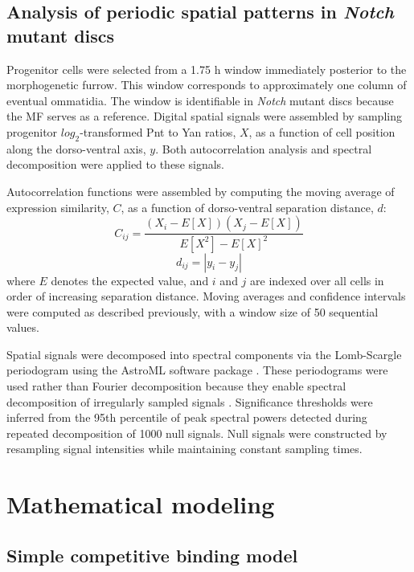 \subsection{Analysis of periodic spatial patterns in \textit{Notch} mutant discs}
\label{appendix:methods:ratio:autocorrelation}

Progenitor cells were selected from a 1.75 h window immediately posterior to the morphogenetic furrow. This window corresponds to approximately one column of eventual ommatidia. The window is identifiable in \textit{Notch} mutant discs because the MF serves as a reference. Digital spatial signals were assembled by sampling progenitor $log_2$-transformed Pnt to Yan ratios, $X$, as a function of cell position along the dorso-ventral axis, $y$. Both autocorrelation analysis and spectral decomposition were applied to these signals.

Autocorrelation functions were assembled by computing the moving average of expression similarity, $C$, as a function of dorso-ventral separation distance, $d$:
\begin{equation}
C_{ij} = \frac{ (X_i-E[X])(X_j-E[X]) }{ E[X^2] - E[X]^2 }
\end{equation}
\begin{equation}
d_{ij} = | y_i - y_j |
\end{equation}
where $E$ denotes the expected value, and $i$ and $j$ are indexed over all cells in order of increasing separation distance. Moving averages and confidence intervals were computed as described previously, with a window size of 50 sequential values.

Spatial signals were decomposed into spectral components via the Lomb-Scargle periodogram using the AstroML software package \cite{VanderPlas2012}. These periodograms were used rather than Fourier decomposition because they enable spectral decomposition of irregularly sampled signals \cite{VanderPlas2018}. Significance thresholds were inferred from the 95th percentile of peak spectral powers detected during repeated decomposition of 1000 null signals. Null signals were constructed by resampling signal intensities while maintaining constant sampling times.

\section{Mathematical modeling}

\subsection{Simple competitive binding model}
\label{appendix:methods:ratio:simple_model}

